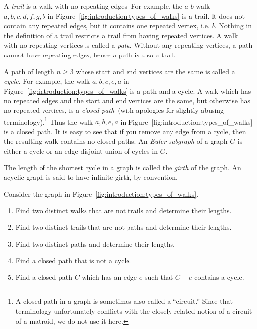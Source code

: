 A \emph{trail} is a walk with no repeating edges. For example, the
$a$-$b$ walk $a, b, c, d, f, g, b$ in
Figure~\ref{fig:introduction:types_of_walks} is a trail. It does not
contain any repeated edges, but it contains one repeated vertex,
i.e. $b$. Nothing in the definition of a trail restricts a trail from
having repeated vertices.
A walk with no repeating vertices is called a \emph{path}. Without any
repeating vertices, a path cannot have repeating edges, hence a path
is also a trail.

A path of length $n \geq 3$ whose start and end vertices are the same
is called a \emph{cycle}. For example, the walk $a, b, c, e, a$
in Figure~\ref{fig:introduction:types_of_walks} is a path and a cycle.
A walk which has no repeated edges and the start and end vertices are
the same, but otherwise has no  repeated vertices, is
a \emph{closed path}~(with apologies for slightly abusing
terminology).\footnote{
A closed path in a graph is sometimes also called a ``circuit.'' Since
that terminology unfortunately conflicts with the closely related
notion of a circuit of a matroid, we do not use it here.}
Thus the walk $a, b, e, a$ in
Figure~\ref{fig:introduction:types_of_walks} is a closed path. It is
easy to see that if you remove any edge from a cycle, then the
resulting walk contains no closed paths. An \emph{Euler subgraph} of a
graph $G$ is either a cycle or an edge-disjoint union of cycles in
$G$.

The length of the shortest cycle in a graph is called the \emph{girth}
of the graph. An acyclic graph is said to have infinite girth, by
convention.

\begin{example}
Consider the graph in Figure~\ref{fig:introduction:types_of_walks}.
%
\begin{enumerate}
\item Find two distinct walks that are not trails and determine their
  lengths.

\item Find two distinct trails that are not paths and determine their
  lengths.

\item Find two distinct paths and determine their lengths.

\item Find a closed path that is not a cycle.

\item Find a closed path $C$ which has an edge $e$ such that $C - e$
  contains a cycle.
\end{enumerate}
\end{example}

